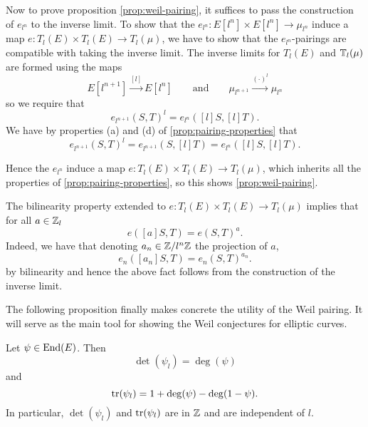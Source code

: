Now to prove proposition \ref{prop:weil-pairing}, it suffices to pass the 
construction of $e_{l^n}$ to the inverse limit.
To show that the $e_{l^n}: E[l^n]\times E[l^n] \to \mu_{l^n}$ induce a map 
$e: T_l(E) \times T_l(E) \to T_l(\mu)$, we have to show that the
$e_{l^n}$-pairings are compatible with taking the inverse limit.
The inverse limits for $T_l(E)$ and $\mathbb{T}_l(\mu)$ are formed using the maps
\begin{equation*}
	E[l^{n+1}]\xrightarrow{[l]}E[l^n]
	\qquad\textrm{and}\qquad
	\mu_{l^{n+1}}\xrightarrow{(\cdot)^l}\mu_{l^n}
\end{equation*}
so
we require that
\begin{equation*}
	e_{l^{n+1}}(S, T)^l = e_{l^n}([l]S, [l]T).	
\end{equation*}
We have by properties (a) and (d) of \ref{prop:pairing-properties} that
\begin{equation*}
	e_{l^{n+1}}(S, T)^l = e_{l^{n+1}}(S, [l]T) = e_{l^n}([l]S, [l]T).
\end{equation*}

Hence the $e_{l^n}$ induce a map $e:T_l(E)\times T_l(E) \to T_l(\mu)$,
which inherits all the properties of \ref{prop:pairing-properties},
so this shows \ref{prop:weil-pairing}.

\begin{remark}
	The bilinearity property extended to $e:T_l(E)\times T_l(E) \to T_l(\mu)$
	implies that for all $a \in \mathbb{Z}_l$
	\begin{equation*}
		e([a]S, T) = e(S, T)^a.
	\end{equation*}
	Indeed, we have that denoting $a_n \in \mathbb{Z}/l^n\mathbb{Z}$ the projection of $a$,
	\begin{equation*}
		e_n([a_n]S, T) = e_n(S, T)^{a_n}.
	\end{equation*}
	by bilinearity and hence the above fact follows from the construction
	of the inverse limit.
\end{remark}


The following proposition finally makes concrete the
utility of the Weil pairing. It will serve as the main tool for showing
the Weil conjectures for elliptic curves.

\begin{proposition}
	\label{prop:deg-tr-det}
	Let $\psi \in \operatorname{End}(E)$. Then
	\begin{equation*}
		\det(\psi_l) = \deg(\psi)
	\end{equation*}
	and
	\begin{equation*}
		\operatorname{tr}(\psi_l) = 1 + \deg(\psi) - \deg(1 - \psi).
	\end{equation*}
	In particular, $\det(\psi_l)$ and $\operatorname{tr}(\psi_l)$ are in $\mathbb{Z}$
	and are independent of $l$.
\end{proposition}

